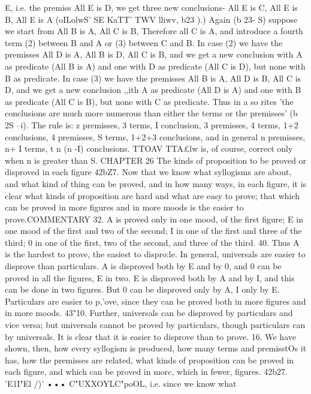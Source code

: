 {{{{{{{{{{{{{{{{{E, i.e. the premiss All E is D, we get three new conclusions-
All E is C, All E is B, All E is A (oILolwS' SE KaTT' TWV lliwv, b23 ).)
Again (b 23- S) suppose we start from All B is A, All C is B,
Therefore all C is A, and introduce a fourth term (2) between
B and A or (3) between C and B. In case (2) we have the premisses
All D is A, All B is D, All C is B, and we get a new conclusion
with A as predicate (All B is A) and one with D as predicate
(All C is D), but none with B as predicate. In case (3) we have
the premisses All B is A, All D is B, All C is D, and we get a
new conclusion ,,{ith A as predicate (All D is A) and one with
B as predicate (All C is B), but none with C as predicate.
Thus in a so rites 'the conclusions are much more numerous
than either the terms or the premisses' (b 2S --{i). The rule is:
z premisses, 3 terms, I conclusion,
3 premisses, 4 terms, 1+2 conclusions,
4 premisses, S terms, 1+2+3 conclusions,
and in general n premisses, n+ I terms, t n (n -I) conclusions.
TTOAV TTA£lw is, of course, correct only when n is greater than S.
CHAPTER 26
The kinds of proposition to be proved or disproved in each figure
42bZ7. Now that we know what syllogisms are about, and what
kind of thing can be proved, and in how many ways, in each
figure, it is clear what kinds of proposition are hard and what are
easy to prove; that which can be proved in more figures and in
more moods is the easier to prove.COMMENTARY
32. A is proved only in one mood, of the first figure; E in one
mood of the first and two of the second; I in one of the first and
three of the third; 0 in one of the first, two of the second, and
three of the third.
40. Thus A is the hardest to prove, the easiest to dispro:le. In
general, universals are easier to disprove than particulars. A is
disproved both by E and by 0, and 0 can be proved in all the
figures, E in two. E is disproved both by A and by I, and this can
be done in two figures. But 0 can be disproved only by A, I only
by E. Particulars are easier to p,'ove, since they can be proved both
in more figures and in more moods.
43"10. Further, universals can be disproved by particulars and
vice versa; but universals cannot be proved by particulars,
though particulars can by universals. It is clear that it is easier
to disprove than to prove.
16. We have shown, then, how every syllogism is produced,
how many terms and premisstOs it has, how the premisses are
related, what kinds of proposition can be proved in each figure,
and which can be proved in morc, which in fewer, figures.
42b27. 'E1I"El /)' ••• C"UXXOYLC"poOL, i.e. since we know what
}}}}}}}}}}}}}}}}}}}
